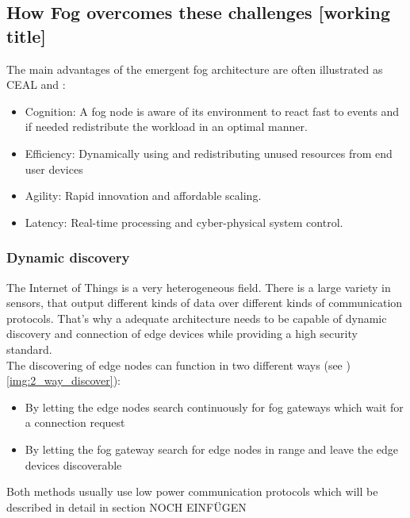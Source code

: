 \subsection{How Fog overcomes these challenges [working title]}\label{sec:fog_challenges}

The main advantages of the emergent fog architecture are often illustrated as CEAL \cite[p. 858]{DBLP:journals/iotj/ChiangZ16} and \cite[p. 7]{OpenFog}:

\begin{itemize}
	\item Cognition: A fog node is aware of its environment to react fast to events and if needed redistribute the workload in an optimal manner.
	\item Efficiency: Dynamically using and redistributing unused resources from end user devices
	\item Agility: Rapid innovation and affordable scaling.
	\item Latency: Real-time processing and cyber-physical system control.
\end{itemize}

\subsubsection{Dynamic discovery}
The Internet of Things is a very heterogeneous field. There is a large variety in sensors, that output  different kinds of data over different kinds of communication protocols. That's why a adequate architecture needs to be capable of dynamic discovery and connection of edge devices while providing a high security standard.\\
The discovering of edge nodes can function in two different ways (see )\autoref{img:2_way_discover}):
\begin{itemize}
	\item By letting the edge nodes search continuously for fog gateways which wait for a connection request
	\item By letting the fog gateway search for edge nodes in range and leave the edge devices discoverable
\end{itemize}


Both methods usually use low power communication protocols which will be described in detail in section NOCH EINFÜGEN

